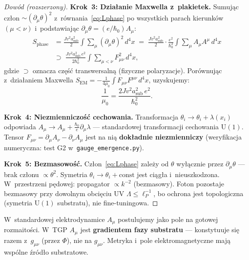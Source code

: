 \begin{proof}[Dowód (rozszerzony)]
\textbf{Krok~3: Działanie Maxwella z~plakietek.}
Sumując człon $\sim(\partial_\mu\theta)^2$ z~równania~\eqref{eq:Lphase}
po wszystkich parach kierunków $(\mu < \nu)$ i~podstawiając
$\partial_\mu\theta = (e/\hbar_0)A_\mu$:
\begin{align}
    S_{\mathrm{phase}}
    &= \frac{Jv^2 a_{\mathrm{sub}}^2}{2}
       \int\!\sum_\mu(\partial_\mu\theta)^2\,d^4x
    \;=\; \frac{Jv^2 a_{\mathrm{sub}}^2}{2}\cdot
          \frac{e^2}{\hbar_0^2}
          \int\!\sum_\mu A_\mu A^\mu\,d^4x \label{eq:Sphase-step1}\\
    &\supset\;
    \frac{Jv^2 a_{\mathrm{sub}}^2\,e^2}{2\hbar_0^2}
    \int\!\sum_{\mu<\nu}F_{\mu\nu}^2\,d^4x, \label{eq:Sphase-maxwell}
\end{align}
gdzie $\supset$ oznacza część transwersalną (fizyczne polaryzacje).
Porównując z~działaniem Maxwella $S_{\mathrm{EM}}
= -\frac{1}{4\mu_0}\int F_{\mu\nu}F^{\mu\nu}\,d^4x$, uzyskujemy:
\begin{equation}\label{eq:mu0-substrate}
    \boxed{
      \frac{1}{\mu_0}
      = \frac{2Jv^2 a_{\mathrm{sub}}^2\,e^2}{\hbar_0^2}.
    }
\end{equation}

\textbf{Krok~4: Niezmienniczość cechowania.}
Transformacja $\theta_i \to \theta_i + \lambda(x_i)$
odpowiada $A_\mu \to A_\mu + \frac{\hbar_0}{e}\partial_\mu\lambda$ ---
standardowej transformacji cechowania $\mathrm{U}(1)$.
Tensor $F_{\mu\nu} = \partial_\mu A_\nu - \partial_\nu A_\mu$ jest
na nią \textbf{dokładnie niezmienniczy}
(weryfikacja numeryczna: test G2 w~\texttt{gauge\_emergence.py}).

\textbf{Krok~5: Bezmasowość.}
Człon~\eqref{eq:Lphase} zależy od $\theta$ wyłącznie przez
$\partial_\mu\theta$ --- brak członu $\propto\theta^2$.
Symetria $\theta_i \to \theta_i + \mathrm{const}$ jest ciągła i~nieuszkodzona.
W~przestrzeni pędowej: propagator $\propto k^{-2}$ (bezmasowy).
Foton pozostaje bezmasowy przy dowolnym obcięciu UV $\Lambda \leq \ell_P^{-1}$,
bo ochrona jest topologiczna (symetria $\mathrm{U}(1)$ substratu),
nie fine-tuningowa.
\end{proof}

\begin{remark}
W~standardowej elektrodynamice $A_\mu$ postulujemy jako pole na
gotowej rozmaitości. W~TGP $A_\mu$ jest \textbf{gradientem fazy
substratu} --- konstytuuje się razem z~$g_{\mu\nu}$ (przez $\Phi$),
nie na $g_{\mu\nu}$. Metryka i~pole elektromagnetyczne mają
wspólne źródło substratowe.
\end{remark}

